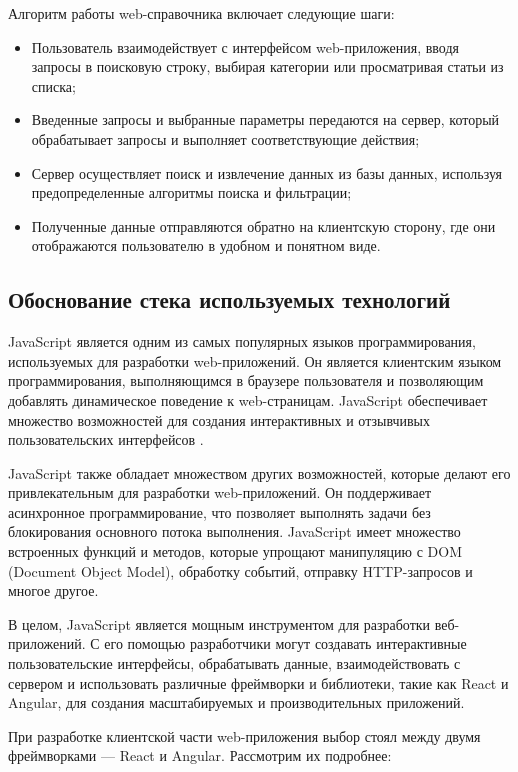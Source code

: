 Алгоритм работы web-справочника включает следующие шаги:

\begin{itemize}
    \item Пользователь взаимодействует с интерфейсом web-приложения, вводя запросы в поисковую строку, выбирая категории или просматривая статьи из списка;
    \item Введенные запросы и выбранные параметры передаются на сервер, который обрабатывает запросы и выполняет соответствующие действия;
    \item Сервер осуществляет поиск и извлечение данных из базы данных, используя предопределенные алгоритмы поиска и фильтрации;
    \item Полученные данные отправляются обратно на клиентскую сторону, где они отображаются пользователю в удобном и понятном виде.
\end{itemize}

\subsection{Обоснование стека используемых технологий}

JavaScript является одним из самых популярных языков программирования, используемых для разработки web-приложений. Он является клиентским языком программирования, выполняющимся в браузере пользователя и позволяющим добавлять динамическое поведение к web-страницам. JavaScript обеспечивает множество возможностей для создания интерактивных и отзывчивых пользовательских интерфейсов \cite{JavaScript}.

JavaScript также обладает множеством других возможностей, которые делают его привлекательным для разработки web-приложений. Он поддерживает асинхронное программирование, что позволяет выполнять задачи без блокирования основного потока выполнения. JavaScript имеет множество встроенных функций и методов, которые упрощают манипуляцию с DOM (Document Object Model), обработку событий, отправку HTTP-запросов и многое другое.

В целом, JavaScript является мощным инструментом для разработки веб-приложений. С его помощью разработчики могут создавать интерактивные пользовательские интерфейсы, обрабатывать данные, взаимодействовать с сервером и использовать различные фреймворки и библиотеки, такие как React и Angular, для создания масштабируемых и производительных приложений.

При разработке клиентской части web-приложения выбор стоял между двумя фреймворками — React и Angular. Рассмотрим их подробнее:

